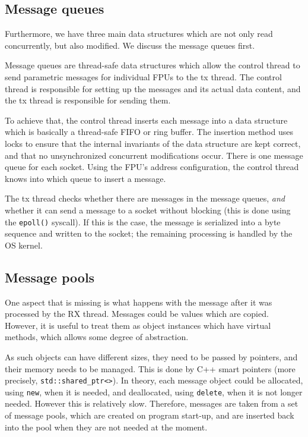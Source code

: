 \documentclass[fontsize=12,a4paper]{scrartcl}
\begin{document}
\subsection{Message queues}
Furthermore, we have three main data structures which are not only
read concurrently, but also modified. We discuss the message queues
first.

Message queues are thread-safe data structures which allow the control
thread to send parametric messages for individual FPUs to the tx
thread. The control thread is responsible for setting up the messages
and its actual data content, and the tx thread is responsible for
sending them.

To achieve that, the control thread inserts each message into a data
structure which is basically a thread-safe FIFO or ring buffer.  The
insertion method uses locks to ensure that the internal invariants of
the data structure are kept correct, and that no unsynchronized
concurrent modifications occur. There is one message queue for each
socket. Using the FPU's address configuration, the control thread
knows into which queue to insert a message.

The tx thread checks whether there are messages in the message queues,
\emph{and} whether it can send a message to a socket without blocking
(this is done using the \texttt{epoll()} syscall). If this is the
case, the message is serialized into a byte sequence and written to
the socket; the remaining processing is handled by the OS kernel.

\subsection{Message pools}

One aspect that is missing is what happens with the message after it
was processed by the RX thread. Messages could be values which are
copied. However, it is useful to treat them as object instances which
have virtual methods, which allows some degree of abstraction.

As such objects can have different sizes, they need to be passed by
pointers, and their memory needs to be managed.  This is done by C++
smart pointers (more precisely, \texttt{std::shared\_ptr<>}). In
theory, each message object could be allocated, using \texttt{new},
when it is needed, and deallocated, using \texttt{delete}, when it is
not longer needed. However this is relatively slow. Therefore,
messages are taken from a set of message pools, which are created on
program start-up, and are inserted back into the pool when they are
not needed at the moment.
\end{document}
